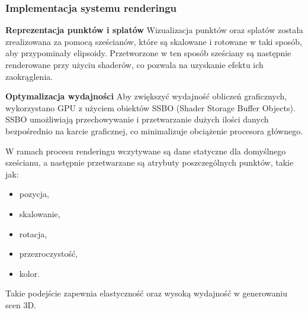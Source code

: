 \subsubsection{Implementacja systemu renderingu}

\textbf{Reprezentacja punktów i splatów}
Wizualizacja punktów oraz splatów została zrealizowana za pomocą sześcianów, które są skalowane i rotowane w taki sposób, aby przypominały elipsoidy. Przetworzone w ten sposób sześciany są następnie renderowane przy użyciu shaderów, co pozwala na uzyskanie efektu ich zaokrąglenia.

\textbf{Optymalizacja wydajności}
Aby zwiększyć wydajność obliczeń graficznych, wykorzystano GPU z użyciem obiektów SSBO (Shader Storage Buffer Objects). SSBO umożliwiają przechowywanie i przetwarzanie dużych ilości danych bezpośrednio na karcie graficznej, co minimalizuje obciążenie procesora głównego.

\clearpage

W ramach procesu renderingu wczytywane są dane statyczne dla domyślnego sześcianu, a następnie przetwarzane są atrybuty poszczególnych punktów, takie jak:
\begin{itemize}
    \item pozycja,
    \item skalowanie,
    \item rotacja,
    \item przezroczystość,
    \item kolor.
\end{itemize}

Takie podejście zapewnia elastyczność oraz wysoką wydajność w generowaniu scen 3D.